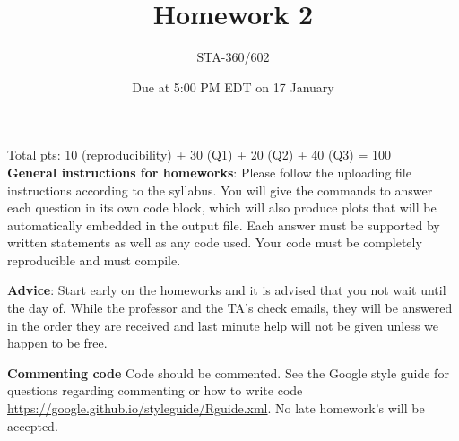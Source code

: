 \documentclass{article}
\begin{document}
\title{Homework 2}
\author{STA-360/602}
\date{Due at 5:00 PM EDT  on 17 January}
\maketitle

Total pts: 10 (reproducibility) + 30 (Q1) + 20 (Q2) + 40 (Q3) = 100\\

\textbf{General instructions for homeworks}: Please follow the uploading file instructions according to the syllabus. You will give the commands to answer each question in its own code block, which will also produce plots that will be automatically embedded in the output file. Each answer must be supported by written statements as well as any code used. Your code must be completely reproducible and must compile. 

\textbf{Advice}: Start early on the homeworks and it is advised that you not wait until the day of. While the professor and the TA's check emails, they will be answered in the order they are received and last minute help will not be given unless we happen to be free.  

\textbf{Commenting code}
Code should be commented. See the Google style guide for questions regarding commenting or how to write 
code \url{https://google.github.io/styleguide/Rguide.xml}. No late homework's will be accepted.

\vspace*{1em}
\end{document}

